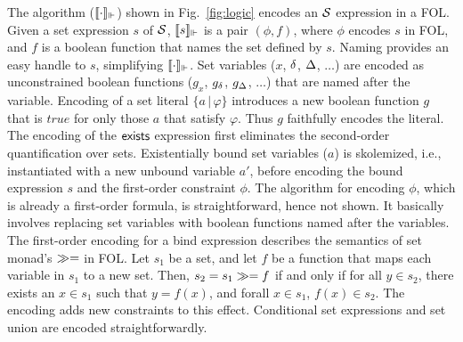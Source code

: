 The algorithm ($\llbracket \cdot \rrbracket_{\Vdash}$) shown in Fig.~\ref{fig:logic}
encodes an $\mathcal{S}$ expression in a FOL. Given a set expression $s$ of
$\mathcal{S}$, $\llbracket s \rrbracket_{\Vdash}$ is a pair $(\phi,f)$, where $\phi$ encodes $s$ in
FOL, and $f$ is a boolean function that names the set defined by $s$.
Naming provides an easy handle to $s$, simplifying $\llbracket \cdot \rrbracket_{\Vdash}$.
Set variables ($x$, $\delta$, $\Delta$, $\dots$) are encoded as
unconstrained boolean functions ($g_x$, $g_{\delta}$, $g_{\Delta}$,
$\ldots$) that are named after the variable.  Encoding of a set
literal $\{a\,|\,\varphi\}$ introduces a new boolean function $g$ that
is $true$ for only those $a$ that satisfy $\varphi$.  Thus $g$
faithfully encodes the literal. The encoding of the ${\sf exists}{}$
expression first eliminates the second-order quantification over sets.
Existentially bound set variables ($a$) is skolemized, i.e.,
instantiated with a new unbound variable $a'$, before encoding the
bound expression $s$ and the first-order constraint $\phi$. The
algorithm for encoding $\phi$, which is already a first-order formula,
is straightforward, hence not shown. It basically involves replacing
set variables with boolean functions named after the variables. The
first-order encoding for a bind expression describes the semantics of
set monad's $\gg=$ in FOL. Let $s_1$ be a set, and let $f$ be a
function that maps each variable in $s_1$ to a new set. Then, $s_2 =
s_1 \gg= f$ if and only if for all $y\in s_2$, there exists an $x \in
s_1$ such that $y = f(x)$, and forall $x\in s_1$, $f(x)\in s_2$. The
encoding adds new constraints to this effect. Conditional set
expressions and set union are encoded straightforwardly.

